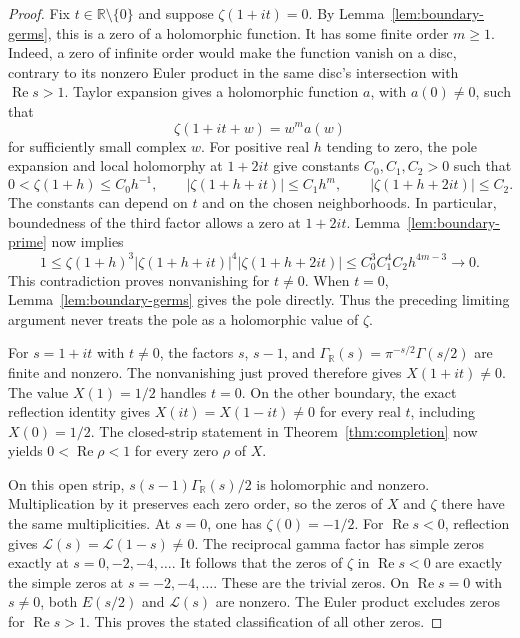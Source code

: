 \documentclass[11pt]{article}
\numberwithin{equation}{section}
\newcommand{\R}{\mathbb R}
\begin{document}
\begin{proof}
Fix $t\in\R\setminus\{0\}$ and suppose $\zeta(1+it)=0$.
By Lemma~\ref{lem:boundary-germs}, this is a zero of a holomorphic
function.  It has some finite order $m\geq1$.
Indeed, a zero of infinite order would make the function vanish on a
disc, contrary to its nonzero Euler product in the same disc's
intersection with $\operatorname{Re}s>1$.
Taylor expansion gives a holomorphic function $a$, with $a(0)\ne0$,
such that
\[
 \zeta(1+it+w)=w^m a(w)
\]
for sufficiently small complex $w$.
For positive real $h$ tending to zero, the pole expansion and local
holomorphy at $1+2it$ give constants $C_0,C_1,C_2>0$ such that
\[
 0<\zeta(1+h)\leq C_0h^{-1},\qquad
 |\zeta(1+h+it)|\leq C_1h^m,\qquad
 |\zeta(1+h+2it)|\leq C_2.
\]
The constants can depend on $t$ and on the chosen neighborhoods.
In particular, boundedness of the third factor allows a zero at $1+2it$.
Lemma~\ref{lem:boundary-prime} now implies
\[
 1\leq\zeta(1+h)^3|\zeta(1+h+it)|^4|\zeta(1+h+2it)|
 \leq C_0^3C_1^4C_2 h^{4m-3}\longrightarrow0.
\]
This contradiction proves nonvanishing for $t\ne0$.
When $t=0$, Lemma~\ref{lem:boundary-germs} gives the pole directly.
Thus the preceding limiting argument never treats the pole as a
holomorphic value of $\zeta$.

For $s=1+it$ with $t\ne0$, the factors $s$, $s-1$, and
$\Gamma_{\R}(s)=\pi^{-s/2}\Gamma(s/2)$ are finite and nonzero.
The nonvanishing just proved therefore gives $X(1+it)\ne0$.
The value $X(1)=1/2$ handles $t=0$.
On the other boundary, the exact reflection identity gives
$X(it)=X(1-it)\ne0$ for every real $t$, including $X(0)=1/2$.
The closed-strip statement in Theorem~\ref{thm:completion} now yields
$0<\operatorname{Re}\rho<1$ for every zero $\rho$ of $X$.

On this open strip, $s(s-1)\Gamma_{\R}(s)/2$ is holomorphic and
nonzero.  Multiplication by it preserves each zero order, so the zeros
of $X$ and $\zeta$ there have the same multiplicities.
At $s=0$, one has $\zeta(0)=-1/2$.
For $\operatorname{Re}s<0$, reflection gives
$\mathcal L(s)=\mathcal L(1-s)\ne0$.
The reciprocal gamma factor has simple zeros exactly at
$s=0,-2,-4,\ldots$.
It follows that the zeros of $\zeta$ in $\operatorname{Re}s<0$ are
exactly the simple zeros at $s=-2,-4,\ldots$.
These are the trivial zeros.
On $\operatorname{Re}s=0$ with $s\ne0$, both $E(s/2)$ and
$\mathcal L(s)$ are nonzero.  The Euler product excludes zeros for
$\operatorname{Re}s>1$.
This proves the stated classification of all other zeros.


\end{proof}
\end{document}
